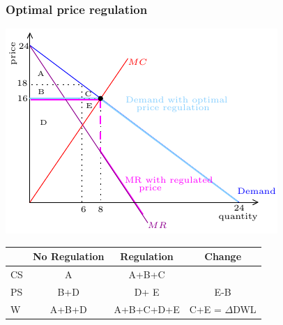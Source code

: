 \documentclass[xcolor=pdftex,dvipsnames]{beamer}
\begin{document}
\begin{frame}
  \frametitle{Optimal price regulation}
  \begin{center}
    \includegraphics{pics/OptReg3}

  {\scriptsize
    \begin{tabular}{lccc}
\hline      & No Regulation & Regulation & Change\\
\hline      CS & A&{\color{white}A+B+C} &{\color{white}{B+C}}\\
\hline      PS & B+D  & {\color{white}D+ E} &  {\color{white}E-B} \\
\hline      W & A+B+D &  {\color{white}A+B+C+D+E} &  {\color{white}C+E = $\Delta$DWL}\\\hline
    \end{tabular}
  }
  \end{center}
\end{frame}
\end{document}
